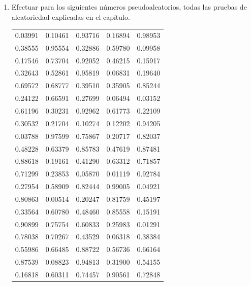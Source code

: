 \documentclass[11pt,letterpaper]{report}
\begin{document}
\begin{enumerate}
\item[3.1.] Efectuar para los siguientes números pseudoaleatorios,
todas las pruebas de aleatoriedad explicadas en el capítulo.

\begin{table}[H]
\centering
\begin{tabular}{ccccc}
\toprule
0.03991 & 0.10461 & 0.93716 & 0.16894 & 0.98953 \\
0.38555 & 0.95554 & 0.32886 & 0.59780 & 0.09958 \\
0.17546 & 0.73704 & 0.92052 & 0.46215 & 0.15917 \\
0.32643 & 0.52861 & 0.95819 & 0.06831 & 0.19640 \\
0.69572 & 0.68777 & 0.39510 & 0.35905 & 0.85244 \\
0.24122 & 0.66591 & 0.27699 & 0.06494 & 0.03152 \\
0.61196 & 0.30231 & 0.92962 & 0.61773 & 0.22109 \\
0.30532 & 0.21704 & 0.10274 & 0.12202 & 0.94205 \\
0.03788 & 0.97599 & 0.75867 & 0.20717 & 0.82037 \\
0.48228 & 0.63379 & 0.85783 & 0.47619 & 0.87481 \\
0.88618 & 0.19161 & 0.41290 & 0.63312 & 0.71857 \\
0.71299 & 0.23853 & 0.05870 & 0.01119 & 0.92784 \\
0.27954 & 0.58909 & 0.82444 & 0.99005 & 0.04921 \\
0.80863 & 0.00514 & 0.20247 & 0.81759 & 0.45197 \\
0.33564 & 0.60780 & 0.48460 & 0.85558 & 0.15191 \\
0.90899 & 0.75754 & 0.60833 & 0.25983 & 0.01291 \\
0.78038 & 0.70267 & 0.43529 & 0.06318 & 0.38384 \\
0.55986 & 0.66485 & 0.88722 & 0.56736 & 0.66164 \\
0.87539 & 0.08823 & 0.94813 & 0.31900 & 0.54155 \\
0.16818 & 0.60311 & 0.74457 & 0.90561 & 0.72848 \\
\bottomrule
\end{tabular}
\end{table}
\end{enumerate}
\end{document}
